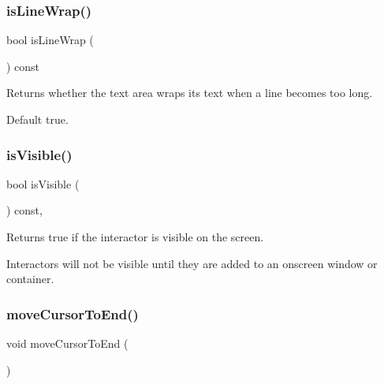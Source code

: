 \subsubsection{\texorpdfstring{is\+Line\+Wrap()}{isLineWrap()}}
{\footnotesize\ttfamily bool is\+Line\+Wrap (\begin{DoxyParamCaption}{ }\end{DoxyParamCaption}) const\hspace{0.3cm}{\ttfamily [virtual]}}



Returns whether the text area wraps its text when a line becomes too long. 

Default true. \mbox{\label{classsgl_1_1GInteractor_a9d8a6cfb13917785c143e74d40e4e2be}} 
\subsubsection{\texorpdfstring{is\+Visible()}{isVisible()}}
{\footnotesize\ttfamily bool is\+Visible (\begin{DoxyParamCaption}{ }\end{DoxyParamCaption}) const\hspace{0.3cm}{\ttfamily [virtual]}, {\ttfamily [inherited]}}



Returns true if the interactor is visible on the screen. 

Interactors will not be visible until they are added to an onscreen window or container. \mbox{\label{classsgl_1_1GTextArea_ab5ef729cac166db0ef51ff7ea30d1bb8}} 
\subsubsection{\texorpdfstring{move\+Cursor\+To\+End()}{moveCursorToEnd()}}
{\footnotesize\ttfamily void move\+Cursor\+To\+End (\begin{DoxyParamCaption}{ }\end{DoxyParamCaption})\hspace{0.3cm}{\ttfamily [virtual]}}



